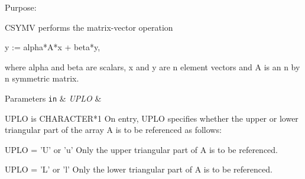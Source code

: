  \begin{DoxyParagraph}{Purpose\+: }
\begin{DoxyVerb} CSYMV  performs the matrix-vector  operation

    y := alpha*A*x + beta*y,

 where alpha and beta are scalars, x and y are n element vectors and
 A is an n by n symmetric matrix.\end{DoxyVerb}
 
\end{DoxyParagraph}

\begin{DoxyParams}[1]{Parameters}
\mbox{\tt in}  & {\em U\+P\+L\+O} & \begin{DoxyVerb}          UPLO is CHARACTER*1
           On entry, UPLO specifies whether the upper or lower
           triangular part of the array A is to be referenced as
           follows:

              UPLO = 'U' or 'u'   Only the upper triangular part of A
                                  is to be referenced.

              UPLO = 'L' or 'l'   Only the lower triangular part of A
                                  is to be referenced.


\end{DoxyVerb}
\end{DoxyParams}
